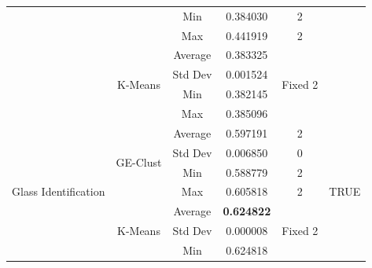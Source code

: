 \documentclass[journal]{IEEEtran}
\begin{document}
\begin{table}[]
\begin{tabular}{|c|c|c|c|c|c|}
			&                               & Min                            & 0.384030                    & 2                        &                       \\ \cline{3-5}
			&                               & Max                            & 0.441919                     & 2                        &                       \\ \cline{2-5}
			& \multirow{4}{*}{K-Means}      & Average                        & 0.383325                    & \multirow{4}{*}{Fixed 2} &                       \\ \cline{3-4}
			&                               & Std Dev                        & 0.001524                    &                          &                       \\ \cline{3-4}
			&                               & Min                            & 0.382145                    &                          &                       \\ \cline{3-4}
			&                               & Max                            & 0.385096                    &                          &                       \\ \hline
			\multirow{8}{*}{Glass Identification}  & \multirow{4}{*}{GE-Clust}           & Average                        & 0.597191                    & 2                        & \multirow{8}{*}{TRUE} \\ \cline{3-5}
			&                               & Std Dev                        & 0.006850                    & 0                        &                       \\ \cline{3-5}
			&                               & Min                            & 0.588779                    & 2                        &                       \\ \cline{3-5}
			&                               & Max                            & 0.605818                    & 2                        &                       \\ \cline{2-5}
			& \multirow{4}{*}{K-Means}      & Average                        & \textbf{0.624822}                    & \multirow{4}{*}{Fixed 2} &                       \\ \cline{3-4}
			&                               & Std Dev                        & 0.000008                    &                          &                       \\ \cline{3-4}
			&                               & Min                            & 0.624818                    &                          &                       \\ \cline{3-4}

\end{tabular}
\end{table}
\end{document}
